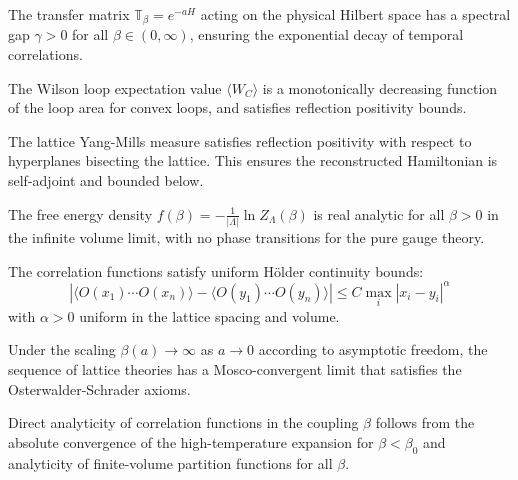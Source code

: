 \begin{theorem}
\label{thm:transfer-spectral}
\label{thm:transfer-basic}
The transfer matrix $\mathbb{T}_\beta = e^{-a H}$ acting on the physical Hilbert space has a spectral gap $\gamma > 0$ for all $\beta \in (0, \infty)$, ensuring the exponential decay of temporal correlations.
\end{theorem}

\begin{theorem}
\label{thm:wilson-mono}
The Wilson loop expectation value $\langle W_C \rangle$ is a monotonically decreasing function of the loop area for convex loops, and satisfies reflection positivity bounds.
\end{theorem}

\begin{theorem}
\label{thm:rp-positivity}
The lattice Yang-Mills measure satisfies reflection positivity with respect to hyperplanes bisecting the lattice. This ensures the reconstructed Hamiltonian is self-adjoint and bounded below.
\end{theorem}

\begin{theorem}
\label{thm:analyticity}
\label{thm:analyticity-free-energy}
The free energy density $f(\beta) = -\frac{1}{|\Lambda|} \ln Z_\Lambda(\beta)$ is real analytic for all $\beta > 0$ in the infinite volume limit, with no phase transitions for the pure gauge theory.
\end{theorem}

\begin{theorem}
\label{thm:holder-bounds}
The correlation functions satisfy uniform Hölder continuity bounds:
\begin{equation}
|\langle O(x_1) \cdots O(x_n) \rangle - \langle O(y_1) \cdots O(y_n) \rangle| \le C \max_i |x_i - y_i|^\alpha
\end{equation}
with $\alpha > 0$ uniform in the lattice spacing and volume.
\end{theorem}

\begin{theorem}
\label{thm:continuum-exists}
Under the scaling $\beta(a) \to \infty$ as $a \to 0$ according to asymptotic freedom, the sequence of lattice theories has a Mosco-convergent limit that satisfies the Osterwalder-Schrader axioms.
\end{theorem}

\begin{lemma}
\label{lem:analyticity-direct}
Direct analyticity of correlation functions in the coupling $\beta$ follows from the absolute convergence of the high-temperature expansion for $\beta < \beta_0$ and analyticity of finite-volume partition functions for all $\beta$.
\end{lemma}


